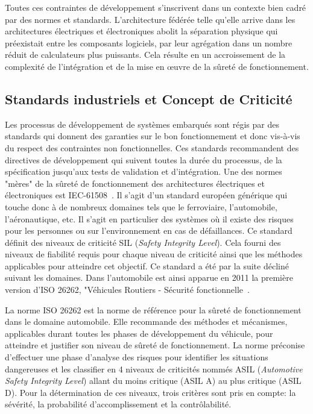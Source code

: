 \documentclass[french, a4paper, 11pt, twoside, pdftex]{StyleThese}
\begin{document}
		Toutes ces contraintes de développement s'inscrivent dans un contexte bien cadré par des normes et standards. L’architecture fédérée telle qu'elle arrive dans les architectures électriques et électroniques abolit la séparation physique qui préexistait entre les composants logiciels, par leur agrégation dans un nombre réduit de calculateurs plus puissants. Cela résulte en un accroissement de la complexité de l’intégration et de la mise en œuvre de la sûreté de fonctionnement. 
	
		\subsection{Standards industriels et Concept de Criticité}	
		Les processus de développement de systèmes embarqués sont régis par des standards qui donnent des garanties sur le bon fonctionnement et donc vis-à-vis du respect des contraintes non fonctionnelles. Ces standards recommandent des directives de développement qui suivent toutes la durée du processus, de la spécification jusqu'aux tests de validation et d'intégration. Une des normes "mères" de la sûreté de fonctionnement des architectures électriques et électroniques est IEC-61508~\cite{iec61508}. Il s'agit d'un standard européen générique qui touche donc à de nombreux domaines tels que le ferroviaire, l'automobile, l'aéronautique, etc. Il s'agit en particulier des systèmes où il existe des risques pour les personnes ou sur l'environnement en cas de défaillances. Ce standard définit des niveaux de criticité SIL (\textit{Safety Integrity Level}). Cela fourni des niveaux de fiabilité requis pour chaque niveau de criticité ainsi que les méthodes applicables pour atteindre cet objectif. Ce standard a été par la suite décliné suivant les domaines. Dans l'automobile est ainsi apparue en 2011 la première version d'ISO 26262, "Véhicules Routiers - Sécurité fonctionnelle~\cite{iso_tc22sc3wg16_iso_2011}. 

		
		La norme ISO 26262 est la norme de référence pour la sûreté de fonctionnement dans le domaine automobile. Elle recommande des méthodes et mécanismes, applicables durant toutes les phases de développement du véhicule, pour atteindre et justifier son niveau de sûreté de fonctionnement. La norme préconise d’effectuer une phase d’analyse des risques pour identifier les situations dangereuses et les classifier en 4 niveaux de criticités nommés ASIL (\textit{Automotive Safety Integrity Level}) allant du moins critique (ASIL A) au plus critique (ASIL D). Pour la détermination de ces niveaux, trois critères sont pris en compte: la sévérité, la probabilité d'accomplissement et la contrôlabilité.
		
\end{document}
